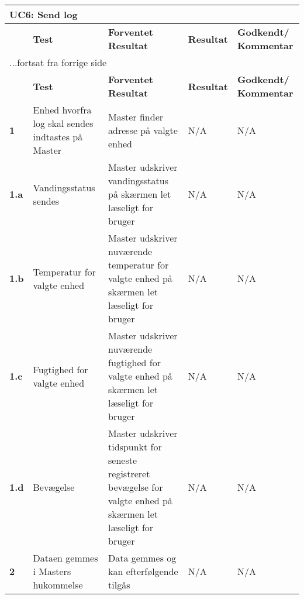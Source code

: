 
\begin{center}
\begin{longtable}{|p{}|p{}|p{}|p{}|p{}|} %
\hline
\multicolumn{5}{|l|}{\textbf{UC6: Send log}} \\ \hline
\multicolumn{1}{|c|}{} &
\textbf{Test} &
\textbf{Forventet \newline Resultat} &
\textbf{Resultat} &
\textbf{Godkendt/ \newline Kommentar} \\ \hline 
\endfirsthead

\multicolumn{5}{l}{...fortsat fra forrige side} \\ \hline 
\multicolumn{1}{|c|}{} &
\textbf{Test} &
\textbf{Forventet \newline Resultat} &
\textbf{Resultat} &
\textbf{Godkendt/ \newline Kommentar} \\ \hline 
\endhead

\textbf{1}	&Enhed hvorfra log skal sendes indtastes på Master
			&Master finder adresse på valgte enhed
			&N/A
			&N/A \\ \hline 
			
\textbf{1.a}	&Vandingsstatus sendes
			&Master udskriver vandingsstatus på skærmen let læseligt for bruger
			&N/A
			&N/A \\ \hline 
			
\textbf{1.b}	&Temperatur for valgte enhed
			&Master udskriver nuværende temperatur for valgte enhed på skærmen let læseligt for bruger
			&N/A
			&N/A \\ \hline 
			
\textbf{1.c}	&Fugtighed for valgte enhed
			&Master udskriver nuværende fugtighed for valgte enhed på skærmen let læseligt for bruger
			&N/A
			&N/A \\ \hline 
			
\textbf{1.d}	&Bevægelse
			&Master udskriver tidspunkt for seneste registreret bevægelse for valgte enhed på skærmen let læseligt for bruger
			&N/A
			&N/A \\ \hline 
			
\textbf{2}	&Dataen gemmes i Masters hukommelse
			&Data gemmes og kan efterfølgende tilgås
			&N/A
			&N/A \\ \hline 
			
\end{longtable}
	\label{ATUC6} 
\end{center}
